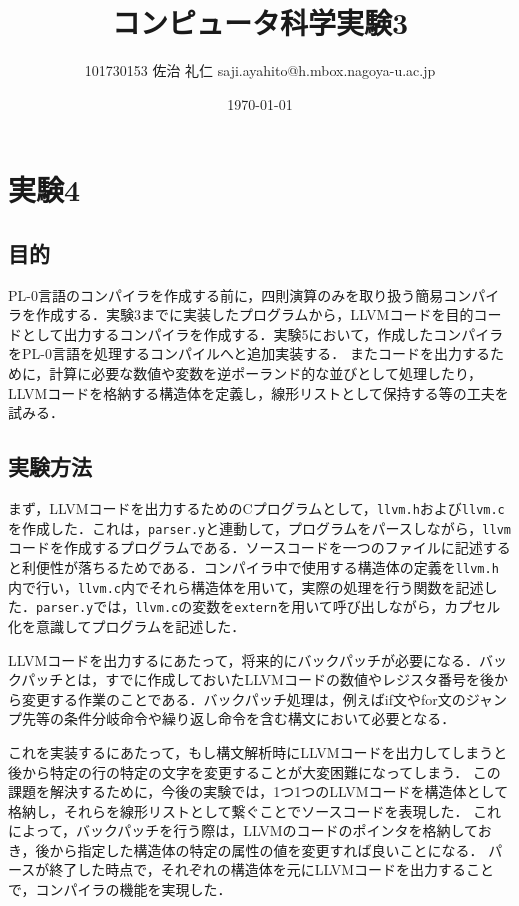 \documentclass[uplatex]{jsarticle}
\title{コンピュータ科学実験3}
\author{101730153 佐治 礼仁 saji.ayahito@h.mbox.nagoya-u.ac.jp}
\date{\today}
\begin{document}
\maketitle
\newpage
\tableofcontents
\newpage
\section{実験4}
\subsection{目的}
PL-0言語のコンパイラを作成する前に，四則演算のみを取り扱う簡易コンパイラを作成する．実験3までに実装したプログラムから，LLVMコードを目的コードとして出力するコンパイラを作成する．実験5において，作成したコンパイラをPL-0言語を処理するコンパイルへと追加実装する．
またコードを出力するために，計算に必要な数値や変数を逆ポーランド的な並びとして処理したり，LLVMコードを格納する構造体を定義し，線形リストとして保持する等の工夫を試みる．
\subsection{実験方法}
まず，LLVMコードを出力するためのCプログラムとして，\verb#llvm.h#および\verb#llvm.c#を作成した．これは，\verb#parser.y#と連動して，プログラムをパースしながら，\verb#llvm#コードを作成するプログラムである．ソースコードを一つのファイルに記述すると利便性が落ちるためである．コンパイラ中で使用する構造体の定義を\verb#llvm.h#内で行い，\verb#llvm.c#内でそれら構造体を用いて，実際の処理を行う関数を記述した．\verb#parser.y#では，\verb#llvm.c#の変数を\verb#extern#を用いて呼び出しながら，カプセル化を意識してプログラムを記述した．

LLVMコードを出力するにあたって，将来的にバックパッチが必要になる．バックパッチとは，すでに作成しておいたLLVMコードの数値やレジスタ番号を後から変更する作業のことである．バックパッチ処理は，例えばif文やfor文のジャンプ先等の条件分岐命令や繰り返し命令を含む構文において必要となる．

これを実装するにあたって，もし構文解析時にLLVMコードを出力してしまうと後から特定の行の特定の文字を変更することが大変困難になってしまう．
この課題を解決するために，今後の実験では，1つ1つのLLVMコードを構造体として格納し，それらを線形リストとして繋ぐことでソースコードを表現した．
これによって，バックパッチを行う際は，LLVMのコードのポインタを格納しておき，後から指定した構造体の特定の属性の値を変更すれば良いことになる．
パースが終了した時点で，それぞれの構造体を元にLLVMコードを出力することで，コンパイラの機能を実現した．
\end{document}
